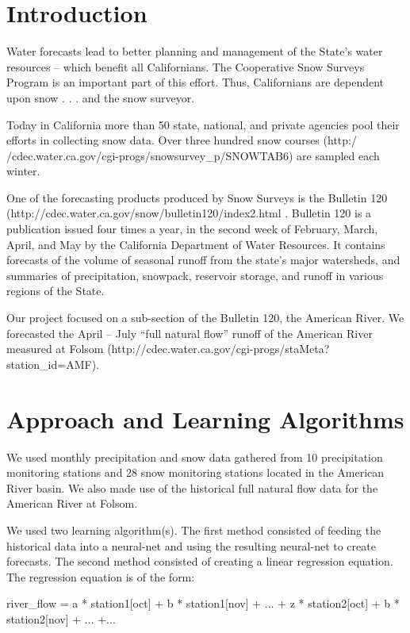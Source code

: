 \documentclass[conference]{IEEEtran}
\begin{document}
\section{Introduction}

Water forecasts lead to better planning and management of the State's water
resources -- which benefit all Californians. The Cooperative Snow Surveys
Program is an important part of this effort. Thus, Californians are dependent
upon snow . . . and the snow surveyor.


Today in California more than 50 state, national, and private agencies pool
their efforts in collecting snow data. Over three hundred snow courses (http:/
/cdec.water.ca.gov/cgi-progs/snowsurvey\_p/SNOWTAB6) are sampled each
winter.

One of the forecasting products produced by Snow Surveys is the Bulletin
120 (http://cdec.water.ca.gov/snow/bulletin120/index2.html . Bulletin 120 is a
publication issued four times a year, in the second week of February, March,
April, and May by the California Department of Water Resources. It contains
forecasts of the volume of seasonal runoff from the state's major watersheds,
and summaries of precipitation, snowpack, reservoir storage, and runoff in
various regions of the State.

Our project focused on a sub-section of the Bulletin 120, the American
River. We forecasted the April – July “full natural flow” runoff of the American
River measured at Folsom (http://cdec.water.ca.gov/cgi-progs/staMeta?
station\_id=AMF).

\section{Approach and Learning Algorithms}
We used monthly precipitation and snow data gathered from 10 precipitation
monitoring stations and 28 snow monitoring stations located in the American
River basin. We also made use of the historical full natural flow data for the
American River at Folsom.

We used two learning algorithm(s). The first method consisted of feeding the
historical data into a neural-net and using the resulting neural-net to create
forecasts.
The second method consisted of creating a linear regression equation. The
regression equation is of the form:

river\_flow = a * station1[oct] + b * station1[nov] + ... + z * station2[oct] + b *
station2[nov] + ... +...
\end{document}
